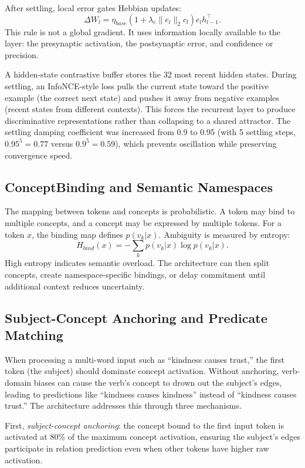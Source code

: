 \documentclass[11pt]{article}
\begin{document}
After settling, local error gates Hebbian updates:
\begin{equation}
 \Delta W_l = \eta_{base}\left(1 + \lambda_e\lVert e_l\rVert_2 c_l\right)e_l h_{l-1}^{\top}.
\end{equation}
This rule is not a global gradient. It uses information locally available to the layer: the presynaptic activation, the postsynaptic error, and confidence or precision.

A hidden-state contrastive buffer stores the 32 most recent hidden states. During settling, an InfoNCE-style loss pulls the current state toward the positive example (the correct next state) and pushes it away from negative examples (recent states from different contexts). This forces the recurrent layer to produce discriminative representations rather than collapsing to a shared attractor. The settling damping coefficient was increased from 0.9 to 0.95 (with 5 settling steps, $0.95^5 = 0.77$ versus $0.9^5 = 0.59$), which prevents oscillation while preserving convergence speed.

\subsection{ConceptBinding and Semantic Namespaces}
The mapping between tokens and concepts is probabilistic. A token may bind to multiple concepts, and a concept may be expressed by multiple tokens. For a token $x$, the binding map defines $p(v_k|x)$. Ambiguity is measured by entropy:
\begin{equation}
 H_{bind}(x)=-\sum_k p(v_k|x)\log p(v_k|x).
\end{equation}
High entropy indicates semantic overload. The architecture can then split concepts, create namespace-specific bindings, or delay commitment until additional context reduces uncertainty.

\subsection{Subject-Concept Anchoring and Predicate Matching}
When processing a multi-word input such as ``kindness causes trust,'' the first token (the subject) should dominate concept activation. Without anchoring, verb-domain biases can cause the verb's concept to drown out the subject's edges, leading to predictions like ``kindness causes kindness'' instead of ``kindness causes trust.'' The architecture addresses this through three mechanisms.

First, \emph{subject-concept anchoring}: the concept bound to the first input token is activated at 80\% of the maximum concept activation, ensuring the subject's edges participate in relation prediction even when other tokens have higher raw activation.
\end{document}
